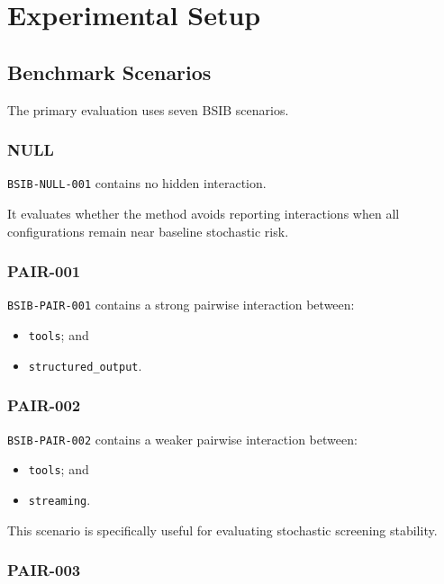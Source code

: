 \section{Experimental Setup}

\subsection{Benchmark Scenarios}

The primary evaluation uses seven BSIB scenarios.

\subsubsection{NULL}

\texttt{BSIB-NULL-001} contains no hidden interaction.

It evaluates whether the method avoids reporting interactions when all configurations remain near baseline stochastic risk.

\subsubsection{PAIR-001}

\texttt{BSIB-PAIR-001} contains a strong pairwise interaction between:

\begin{itemize}
\tightlist
\item
  \texttt{tools}; and
\item
  \texttt{structured\_output}.
\end{itemize}

\subsubsection{PAIR-002}

\texttt{BSIB-PAIR-002} contains a weaker pairwise interaction between:

\begin{itemize}
\tightlist
\item
  \texttt{tools}; and
\item
  \texttt{streaming}.
\end{itemize}

This scenario is specifically useful for evaluating stochastic screening stability.

\subsubsection{PAIR-003}

